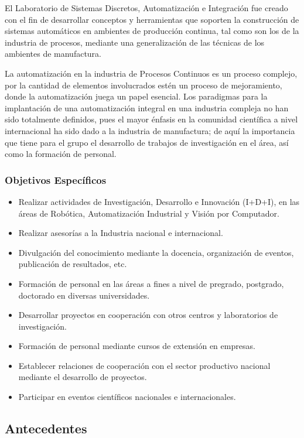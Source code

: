 El Laboratorio de Sistemas Discretos, Automatización e Integración fue creado con el fin de desarrollar conceptos y herramientas que soporten la construcción de sistemas automáticos en ambientes de producción continua, tal como son los de la industria de procesos, mediante una generalización de las técnicas de los ambientes de manufactura.

La automatización en la industria de Procesos Continuos es un proceso complejo, por la cantidad de elementos involucrados estén un proceso de mejoramiento, donde la automatización juega un papel esencial. Los paradigmas para la implantación de una automatización integral en una industria compleja no han sido totalmente definidos, pues el mayor énfasis en la comunidad científica a nivel internacional ha sido dado a la industria de manufactura; de aquí la importancia que tiene para el grupo el desarrollo de trabajos de investigación en el área, así como la formación de personal.

\subsubsection{Objetivos Específicos}

\begin{itemize}
	\itemsep1pt \parskip0pt 
	\item Realizar actividades de Investigación, Desarrollo e Innovación (I+D+I), en las áreas de Robótica, Automatización Industrial y Visión por Computador.
    \item Realizar asesorías a la Industria nacional e internacional.
    \item Divulgación del conocimiento mediante la docencia, organización de eventos, publicación de resultados, etc.
    \item Formación de personal en las áreas a fines a nivel de pregrado, postgrado, doctorado en diversas universidades.
    \item Desarrollar proyectos en cooperación con otros centros y laboratorios de investigación.
    \item Formación de personal mediante cursos de extensión en empresas.
    \item Establecer relaciones de cooperación con el sector productivo nacional mediante el desarrollo de proyectos.
    \item Participar en eventos científicos nacionales e internacionales.
\end{itemize}

\subsection{Antecedentes}

